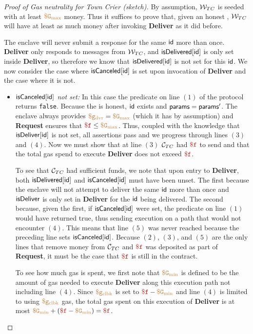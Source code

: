 \begin{proof}[Proof of Gas neutrality for Town Crier (sketch)]
By assumption, ${\cal W}_{TC}$ is seeded with at least $\tt {\color{brown} \$G_\text{max} }$ money.
Thus it suffices to prove that, given an honest \medname, ${\cal W}_{TC}$ will have at least as much money after invoking {\bf Deliver} as it did before.

The enclave will never submit a response for the same ${\sf id}$ more than once.
{\bf Deliver} only responds to messages from ${\cal W}_{TC}$, and ${\sf isDelivered}[{\sf id}]$ is only set inside {\bf Deliver},
so therefore we know that ${\sf isDelivered}[{\sf id}]$ is not set for this ${\sf id}$.
We now consider the case where ${\sf isCanceled}[{\sf id}]$ is set upon invocation of {\bf Deliver} and the case where it is not.
\begin{itemize}

\item {\it ${\sf isCanceled}[{\sf id}]$ not set:}
In this case the predicate on line $(1)$ of the protocol returns {\tt false}.
Because the \medname is honest, ${\sf id}$ exists and ${\sf params} = {\sf params}'$.
The enclave always provides $\tt {\color{brown} \$g_\text{dvr} } = \tt {\color{brown} \$G_\text{max} }$ (which it has by assumption) and {\bf Request} ensures that $\fee \leq \constgasmax$.
Thus, coupled with the knowledge that ${\sf isDeliver}[{\sf id}]$ is not set, all assertions pass and we progress through lines $(3)$ and $(4)$.
Now we must show that at line $(3)$ ${\cal C}_{TC}$ had $\fee$ to send and that the total gas spend to execute {\bf Deliver} does not exceed $\fee$.

To see that ${\cal C}_{TC}$ had sufficient funds, we note that upon entry to {\bf Deliver}, both ${\sf isDelivered}[{\sf id}]$ and ${\sf isCanceled}[{\sf id}]$ must have been unset.
The first because the enclave will not attempt to deliver the same ${\sf id}$ more than once and ${\sf isDeliver}$ is only set in {\bf Deliver} for the ${\sf id}$ being delivered.
The second because, given the first, if ${\sf isCanceled}[{\sf id}]$ were set, the predicate on line $(1)$ would have returned true, thus sending execution on a path that would not encounter $(4)$.
This means that line $(5)$ was never reached because the preceding line sets ${\sf isCanceled}[{\sf id}]$.
Because $(2)$, $(3)$, and $(5)$ are the only lines that remove money from ${\cal C}_{TC}$ and $\fee$ was deposited as part of {\bf Request},
it must be the case that $\fee$ is still in the contract.

To see how much gas is spent, we first note that $\tt {\color{brown} \$G_\text{min} }$ is defined to be the amount of gas needed to execute {\bf Deliver} along this execution path not including line $(4)$.
Since $\tt {\color{brown} \$g_\text{clbk} }$ is set to $\fee - \constgasmin$ and line $(4)$ is limited to using $\tt {\color{brown} \$g_\text{clbk} }$ gas,
the total gas spent on this execution of {\bf Deliver} is at most $\constgasmin + (\fee - \constgasmin) = \fee$.



\end{itemize}
\end{proof}
